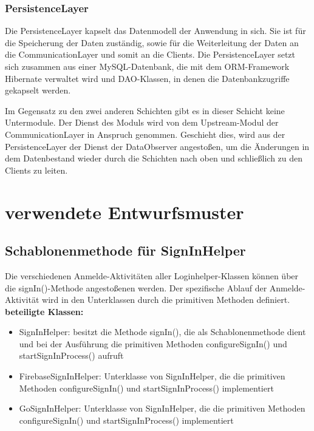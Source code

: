 \documentclass[11pt,a4paper]{article}
\begin{document}
\subsubsection{PersistenceLayer}
Die PersistenceLayer kapselt das Datenmodell der Anwendung in sich. Sie ist für die Speicherung der Daten zuständig, sowie für die Weiterleitung der Daten an die CommunicationLayer und somit an die Clients. Die PersistenceLayer setzt sich zusammen aus einer MySQL-Datenbank, die mit dem ORM-Framework Hibernate verwaltet wird und DAO-Klassen, in denen die Datenbankzugriffe gekapselt werden.

Im Gegensatz zu den zwei anderen Schichten gibt es in dieser Schicht keine Untermodule. Der Dienst des Moduls wird von dem Upstream-Modul der CommunicationLayer in Anspruch genommen. Geschieht dies, wird aus der PersistenceLayer der Dienst der DataObserver angestoßen, um die Änderungen in dem Datenbestand wieder durch die Schichten nach oben und schließlich zu den Clients zu leiten.

\newpage


\section{verwendete Entwurfsmuster}

\subsection{Schablonenmethode für SignInHelper}
Die verschiedenen Anmelde-Aktivitäten aller Loginhelper-Klassen können über die signIn()-Methode angestoßenen werden. Der spezifische Ablauf der Anmelde-Aktivität wird in den Unterklassen durch die primitiven Methoden definiert. \\

\textbf{beteiligte Klassen:}
\begin{itemize}
	\item SignInHelper: besitzt die Methode signIn(), die als Schablonenmethode dient und bei der Ausführung die primitiven Methoden configureSignIn() und startSignInProcess() aufruft
	\item FirebaseSignInHelper: Unterklasse von SignInHelper, die die primitiven Methoden configureSignIn() und startSignInProcess() implementiert
	\item GoSignInHelper: Unterklasse von SignInHelper, die die primitiven Methoden configureSignIn() und startSignInProcess() implementiert
\end{itemize}
\end{document}
